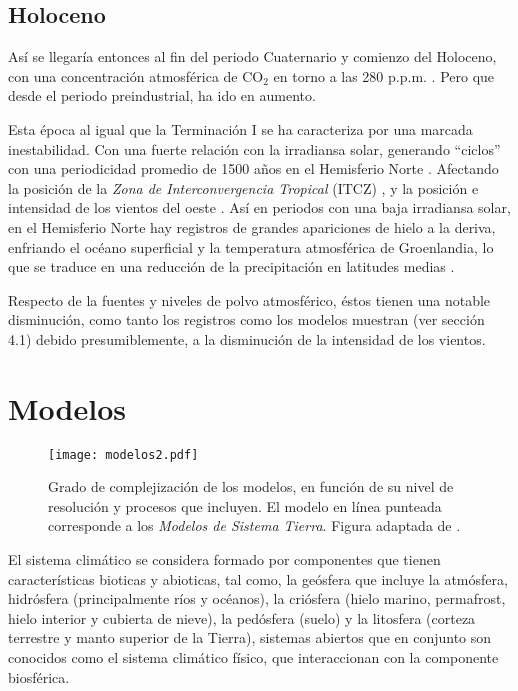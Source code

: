 \subsection{Holoceno}

Así se llegaría entonces al fin del periodo Cuaternario y comienzo del Holoceno, con una concentración atmosférica de CO$_2$ en torno a las 280 p.p.m. \citep{sigman2000glacial}. Pero que desde el periodo preindustrial, ha ido en aumento.

 Esta época al igual que la Terminación I se ha caracteriza por una marcada inestabilidad. Con una fuerte relación con la irradiansa solar, generando ``ciclos'' con una periodicidad promedio de 1500 años en el Hemisferio Norte \citep{bond2001persistent}. Afectando la posición de la \textit{Zona de Interconvergencia Tropical} (ITCZ) \citep{haug2001southward}, y la posición e intensidad de los vientos del oeste \citep{moreno2010covariability,lamy2010holocene}. Así en periodos con una baja irradiansa solar, en el Hemisferio Norte hay registros de grandes apariciones de hielo a la deriva, enfriando el océano superficial y la temperatura atmosférica de Groenlandia, lo que se traduce en una reducción de la precipitación en latitudes medias \citep{bond2001persistent}. 

 Respecto de la fuentes y niveles de polvo atmosférico, éstos tienen una notable disminución, como tanto los registros como los modelos muestran (ver sección 4.1) \citep{mahowald1999dust,kohfeld2001dirtmap} debido presumiblemente, a la disminución de la intensidad de los vientos.

\section{Modelos}

\begin{figure}[H]
\centering
 \texttt{[image: modelos2.pdf]}
 \caption[Tipos de modelos]{Grado de complejización de los modelos, en función de su nivel de resolución y procesos que incluyen. El modelo en línea punteada corresponde a los \textit{Modelos de Sistema Tierra}. Figura adaptada de \citep{bartlein2003modeling}. }
  \label{fig:modelos}
\end{figure}

El sistema climático se considera formado por componentes que tienen características bioticas y abioticas, tal como, la geósfera que incluye la atmósfera, hidrósfera (principalmente ríos y océanos), la criósfera (hielo marino, permafrost, hielo interior y cubierta de nieve), la pedósfera (suelo) y la litosfera (corteza terrestre y manto superior de la Tierra), sistemas abiertos que en conjunto son conocidos como el sistema climático físico, que interaccionan con la componente biosférica. 

